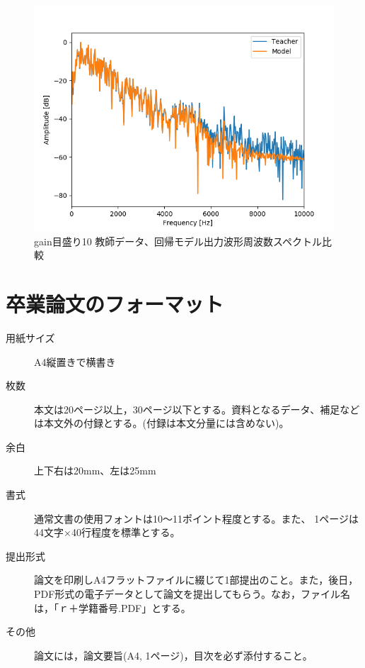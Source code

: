 \documentclass{jreport}		%
\begin{document}
\begin{figure}[htbp]
 \begin{center}
  \includegraphics[width=150mm]{gain10_fft_hikaku.png}
 \end{center}
 \caption{gain目盛り10 教師データ、回帰モデル出力波形周波数スペクトル比較}
 \label{fig:one}
\end{figure}

\clearpage
\section{卒業論文のフォーマット}%
\begin{description}
\item[用紙サイズ] A4縦置きで横書き
\item[枚数] 本文は20ページ以上，30ページ以下とする。資料となるデータ、補足などは本文外の付録とする。(付録は本文分量には含めない)。
\item[余白] 上下右は20mm、左は25mm
\item[書式] 通常文書の使用フォントは10〜11ポイント程度とする。また、
1ページは44文字×40行程度を標準とする。
\item[提出形式] 論文を印刷しA4フラットファイルに綴じて1部提出のこと。また，後日，PDF形式の電子データとして論文を提出してもらう。なお，ファイル名は，「ｒ＋学籍番号.PDF」とする。
\item[その他] 論文には，論文要旨(A4, 1ページ)，目次を必ず添付すること。
\end{description}
\end{document}

